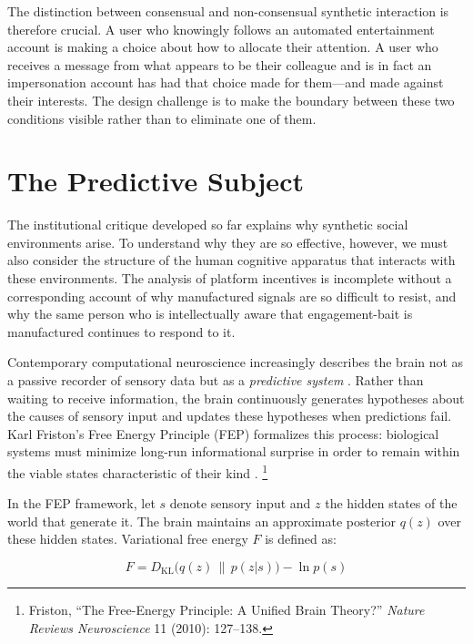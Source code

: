 \documentclass[12pt,a4paper]{article}
\begin{document}
The distinction between consensual and non-consensual synthetic interaction is therefore crucial.
A user who knowingly follows an automated entertainment account is making a choice about how to
allocate their attention. A user who receives a message from what appears to be their colleague
and is in fact an impersonation account has had that choice made for them---and made against
their interests. The design challenge is to make the boundary between these two conditions
visible rather than to eliminate one of them.

\section{The Predictive Subject}

The institutional critique developed so far explains why synthetic social environments arise.
To understand why they are so effective, however, we must also consider the structure of the
human cognitive apparatus that interacts with these environments. The analysis of platform
incentives is incomplete without a corresponding account of why manufactured signals are so
difficult to resist, and why the same person who is intellectually aware that engagement-bait
is manufactured continues to respond to it.

Contemporary computational neuroscience increasingly describes the brain not as a passive
recorder of sensory data but as a \emph{predictive system} \citep{friston2010,solms2021}.
Rather than waiting to receive information, the brain continuously generates hypotheses about
the causes of sensory input and updates these hypotheses when predictions fail. Karl Friston's
Free Energy Principle (FEP) formalizes this process: biological systems must minimize long-run
informational surprise in order to remain within the viable states characteristic of their kind
\citep{friston2010,friston2013}.%
\footnote{Friston, ``The Free-Energy Principle: A Unified Brain Theory?''
\emph{Nature Reviews Neuroscience} 11 (2010): 127--138.}

In the FEP framework, let $s$ denote sensory input and $z$ the hidden states of the world
that generate it. The brain maintains an approximate posterior $q(z)$ over these hidden states.
Variational free energy $F$ is defined as:

\begin{equation}
F = D_{\mathrm{KL}}\!\bigl(q(z)\,\|\,p(z|s)\bigr) - \ln p(s)
\label{eq:fep}
\end{equation}
\end{document}

